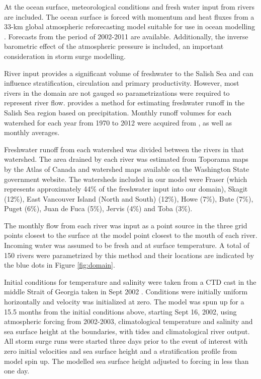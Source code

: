 \documentclass[pdftex,10pt]{article}
\begin{document}
At the ocean surface, meteorological conditions and fresh water input from rivers are included. The ocean surface is forced with momentum and heat fluxes from a 33-km global atmospheric reforecasting model suitable for use in ocean modelling \citep{smith2014new}. Forecasts from the period of 2002-2011 are available. Additionally, the inverse barometric effect of the atmospheric pressure is included, an important consideration in storm surge modelling. 

River input provides a significant volume of freshwater to the Salish Sea and can influence stratification, circulation and primary productivity. However, most rivers in the domain are not gauged so parametrizations were required to represent river flow. \citet{morrison2011rivers} provides a method for estimating freshwater runoff in the Salish Sea region based on precipitation. Monthly runoff volumes for each watershed for each year from 1970 to 2012 were acquired from \citet{morrison2011rivers}, as well as monthly averages. 

Freshwater runoff from each watershed was divided between the rivers in that watershed. The area drained by each river was estimated from Toporama maps by the Atlas of Canada and watershed maps available on the Washington State government website. The watersheds included in our model were Fraser (which represents approximately 44\% of the freshwater input into our domain), Skagit (12\%), East Vancouver Island (North and South) (12\%), Howe (7\%), Bute (7\%), Puget (6\%), Juan de Fuca (5\%), Jervis (4\%) and Toba (3\%). 

The monthly flow from each river was input as a point source in the three grid points closest to the surface at the model point closest to the mouth of each river. Incoming water was assumed to be fresh and at surface temperature. A total of 150 rivers were parametrized by this method and their locations are indicated by the blue dots in Figure \ref{fig:domain}.

Initial conditions for temperature and salinity were taken from a CTD cast in the middle Strait of Georgia taken in Sept 2002 \citep{pawlowiczetal2007}.  Conditions were initially uniform horizontally and velocity was initialized at zero. The model was spun up for a 15.5 months from the initial conditions above, starting Sept 16, 2002, using atmospheric forcing from 2002-2003, climatological temperature and salinity and sea surface height at the boundaries, with tides and climatological river output.  All storm surge runs were started three days prior to the event of interest with zero initial velocities and sea surface height and a stratification profile from model spin up. The modelled sea surface height adjusted to forcing in less than one day. 
\end{document}
